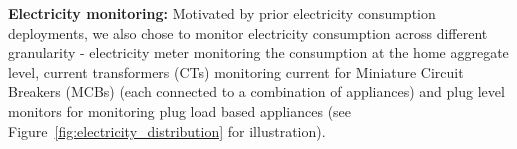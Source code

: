 \documentclass[10pt]{sensys-proc}
\newcommand{\figref}[1]{Figure~\ref{#1}}
\begin{document}
\noindent\textbf{Electricity monitoring:} %
Motivated by prior electricity consumption deployments, we also chose to monitor electricity consumption across different granularity - electricity meter monitoring the consumption at the home aggregate level, current transformers (CTs) monitoring current for Miniature Circuit Breakers (MCBs) (each connected to a combination of appliances) and plug level monitors for monitoring plug load based appliances (see \figref{fig:electricity_distribution} for illustration). 
\end{document}
